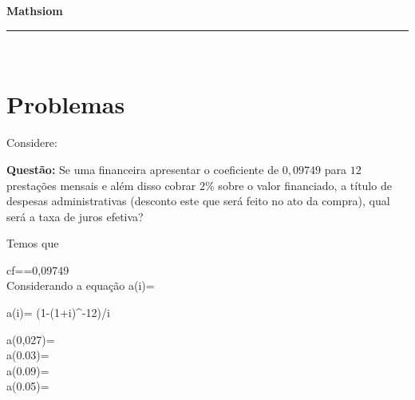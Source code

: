 \documentclass[11pt,a4paper]{article}
\newcommand{\nomer}{\bf Mathsiom}
\begin{document}
\Large
\large
\begin{center}
\noindent  \nomer
\end{center}
\hfill   %
\hrule\ 
\section*{\sc Problemas}
Considere\cite{fina2007mathias}:


{\bf Questão: }Se uma financeira apresentar o coeficiente de $0,09749$ para $12$ prestações mensais e além disso cobrar $2\%$ sobre o valor financiado, a título de despesas administrativas (desconto este que será feito no ato da compra), qual será a taxa de juros efetiva?

{\sol Temos que}

\ben
cf==0,09749\\
\een
Considerando a equação
\ben
a(i)= 
\een
\begin{sagesilent}
a(i)= (1-(1+i)^-12)/i
\end{sagesilent}


\ben
a(0,027)=\\
a(0.03)=\\
a(0.09)=\\
a(0.05)=
\een

\printbibliography
\end{document}

